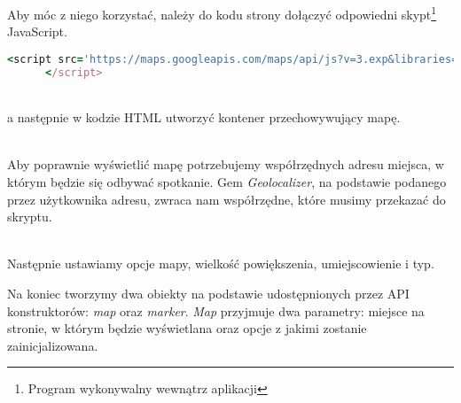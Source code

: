 Aby móc z niego korzystać, należy do kodu strony dołączyć odpowiedni skypt\footnote{Program wykonywalny wewnątrz aplikacji} JavaScript.
\begin{code}
  \begin{lstlisting}[language=Ruby, basicstyle=\ttfamily\scriptsize, showstringspaces=false]
      <script src='https://maps.googleapis.com/maps/api/js?v=3.exp&libraries=places'>
      </script>
  \end{lstlisting}
\end{code}\\

a następnie w kodzie HTML utworzyć kontener przechowywujący mapę.
\begin{code}
  
\end{code}\\

Aby poprawnie wyświetlić mapę potrzebujemy współrzędnych adresu miejsca, w którym będzie się odbywać spotkanie. Gem \emph{Geolocalizer}, na podstawie podanego przez użytkownika adresu, zwraca nam współrzędne, które musimy przekazać do skryptu.

\begin{code}
  
\end{code}\\

Następnie ustawiamy opcje mapy, wielkość powiększenia, umiejscowienie i typ.

Na koniec tworzymy dwa obiekty na podstawie udostępnionych przez API konstruktorów: \emph{map} oraz \emph{marker}. \emph{Map} przyjmuje dwa parametry: miejsce na stronie, w którym będzie wyświetlana oraz opcje z jakimi zostanie zainicjalizowana.
